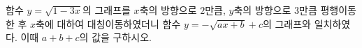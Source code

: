 \hspace*{2mm}\begin{minipage}[t]{\dimexpr\linewidth-2mm\relax}\vspace{0pt}
함수 $y=\sqrt{1-3x}$의 그래프를 $x$축의 방향으로 $2$만큼, $y$축의 방향으로 $3$만큼 평행이동한 후 $x$축에 대하여 대칭이동하였더니 함수 $y=-\sqrt{ax+b}+c$의 그래프와 일치하였다. 이때 $a+b+c$의 값을 구하시오. \end{minipage}
